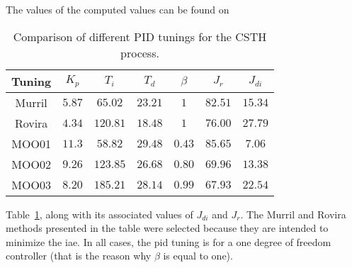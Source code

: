 The values of the computed values can be found on %
\begin{table}[tb]
	\centering
	\caption{Comparison of different PID tunings for the CSTH process.}
	\setlength{\tabcolsep}{8pt}
	\begin{tabular}{ccccccc}
		\toprule
		Tuning 	& $K_p$ 	& $T_i$		& $T_d$		& $\beta$	& $J_{r}$	& $J_{di}$\\
		\midrule
		Murril	& $5.87$	& $65.02$	& $23.21$	& $1$			& $82.51$	& $15.34$\\
		Rovira	& $4.34$	& $120.81$	& $18.48$	& $1$			& $76.00$	& $27.79$\\
		MOO01	& $11.3$	& $58.82$	& $29.48$	& $0.43$		& $85.65$	& $7.06$\\
		MOO02	& $9.26$	& $123.85$	& $26.68$	& $0.80$		& $69.96$	& $13.38$\\
		MOO03	& $8.20$	& $185.21$	& $28.14$	& $0.99$		& $67.93$	& $22.54$\\
		\bottomrule
	\end{tabular}
	\label{tab:CompPIDCSTH}
\end{table}
%
Table~\ref{tab:CompPIDCSTH}, along with its associated values of $J_{di}$ and $J_r$. The Murril and Rovira methods presented in the table were selected because they are intended to minimize the \gls{iae}. In all cases, the \gls{pid} tuning is for a one degree of freedom controller (that is  the reason why $\beta$ is equal to one).

